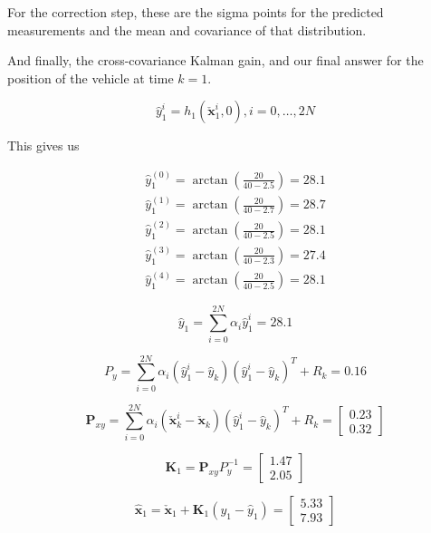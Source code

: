 For the correction step, these are the sigma points for the predicted measurements and the mean
and covariance of that distribution. 


And finally,
the cross-covariance Kalman gain, and our final answer for
the position of the vehicle at time $k = 1$. 

\begin{equation}
\hat{y}_{1}^{i} = h_1(\check{\mathbf{x}}_{1}^{i}, 0), i = 0, \ldots, 2N
\end{equation}

This gives us

\begin{eqnarray}
\hat{y}_{1}^{(0)} = \arctan(\frac{20}{40 - 2.5}) = 28.1 \\ 
\hat{y}_{1}^{(1)} = \arctan(\frac{20}{40 - 2.7}) = 28.7 \\ 
\hat{y}_{1}^{(2)} = \arctan(\frac{20}{40 - 2.5}) = 28.1 \\
\hat{y}_{1}^{(3)} = \arctan(\frac{20}{40 - 2.3}) = 27.4 \\
\hat{y}_{1}^{(4)} = \arctan(\frac{20}{40 - 2.5}) = 28.1 
\label{ukf_example_prediction}
\end{eqnarray}


\begin{equation}
\hat{y}_1 = \sum_{i=0}^{2N} \alpha_i \hat{y}_{1}^{i}  = 28.1
\end{equation}

\begin{equation}
P_y = \sum_{i=0}^{2N} \alpha_i (\hat{y}_{1}^{i} -\hat{y}_{k})(\hat{y}_{1}^{i} -\hat{y}_{k})^T + R_k = 0.16
\end{equation}

\begin{equation}
\mathbf{P}_{xy} = \sum_{i=0}^{2N} \alpha_i (\check{\mathbf{x}}_{k}^{i} -\check{\mathbf{x}}_{k})(\hat{y}_{1}^{i} -\hat{y}_{k})^T + R_k = 
\begin{bmatrix}
0.23 \\
0.32
\end{bmatrix}
\end{equation}

\begin{equation}
\mathbf{K}_{1} = \mathbf{P}_{xy}P_{y}^{-1}= 
\begin{bmatrix}
1.47 \\
2.05
\end{bmatrix}
\end{equation}

\begin{equation}
\hat{\mathbf{x}}_{1} = \check{\mathbf{x}}_{1} + \mathbf{K}_{1}(y_1 - \hat{y}_1) = 
\begin{bmatrix}
5.33 \\
7.93
\end{bmatrix}
\end{equation}

